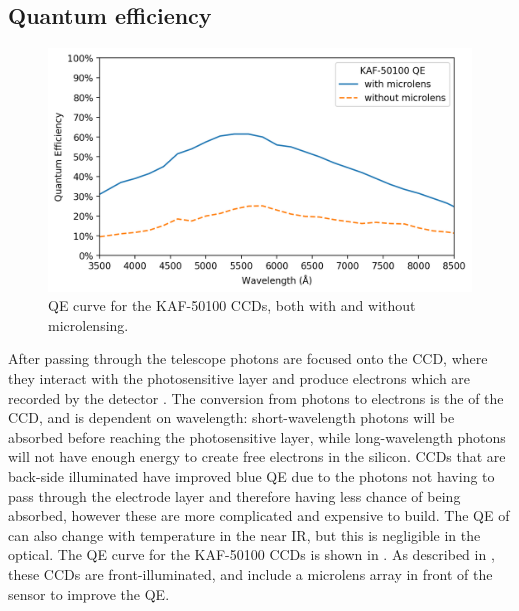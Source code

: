 
\subsection{Quantum efficiency}
\label{sec:qe}
\begin{colsection}

\begin{figure}[t]
    \begin{center}
        \includegraphics[width=\linewidth]{images/throughput/qe.png}
    \end{center}
    \caption[CCD quantum efficiency curve]{
        QE curve for the KAF-50100 CCDs, both with and without microlensing.
    }\label{fig:qe}
\end{figure}

After passing through the telescope photons are focused onto the CCD, where they interact with the photosensitive layer and produce electrons which are recorded by the detector \citep{CCDs}. The conversion from photons to electrons is the  of the CCD, and is dependent on wavelength: short-wavelength photons will be absorbed before reaching the photosensitive layer, while long-wavelength photons will not have enough energy to create free electrons in the silicon. CCDs that are back-side illuminated have improved blue QE due to the photons not having to pass through the electrode layer and therefore having less chance of being absorbed, however these are more complicated and expensive to build. The QE of can also change with temperature in the near IR, but this is negligible in the optical. The QE curve for the KAF-50100 CCDs is shown in . As described in , these CCDs are front-illuminated, and include a microlens array in front of the sensor to improve the QE.\@

\end{colsection}

